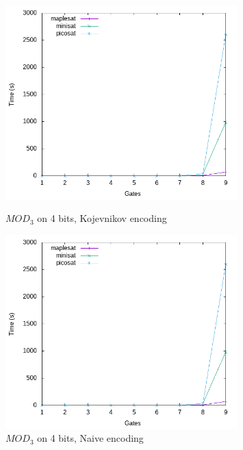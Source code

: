 \documentclass{article}
\begin{document}
\begin{figure}[h!]
\centering

  \includegraphics[width=0.8\textwidth]{images/times/4mod3_naive.png}  
  \caption{$MOD_3$ on 4 bits, Kojevnikov encoding}
  \includegraphics[width=0.8\textwidth]{images/times/4mod3_naive.png}  
  \caption{$MOD_3$ on 4 bits, Naive encoding}
\end{figure}
\end{document}
